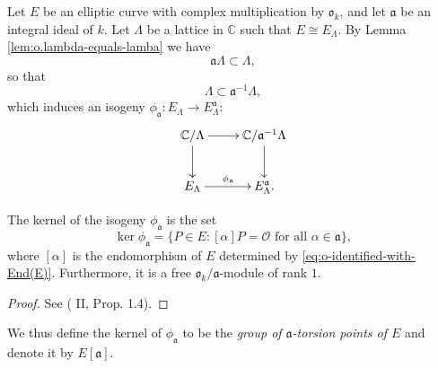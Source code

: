Let $E$ be an elliptic curve with complex multiplication by $\mathfrak{o}_{k}$, and
let $\mathfrak{a}$ be an integral ideal of $k$.  Let $\Lambda$ be a lattice in
$\mathbb{C}$ such that $E \cong E_{\Lambda}$.  By Lemma
\ref{lem:o.lambda-equals-lamba} we have
\begin{equation*}
  \mathfrak{a}\Lambda \subset \Lambda,
\end{equation*}
so that
\begin{equation*}
  \Lambda \subset \mathfrak{a}^{-1}\Lambda,
\end{equation*}
which induces an isogeny $\phi_{\mathfrak{a}} : E_{\Lambda} \rightarrow
E_{\Lambda}^{\mathfrak{a}}$:
\begin{equation*}
  \xymatrix{
    \mathbb{C} / \Lambda \ar[d] \ar[r] & \mathbb{C} / \mathfrak{a}^{-1}\Lambda \ar[d] \\
    E_{\Lambda} \ar[r]^{\phi_{\mathfrak{a}}} & E_{\Lambda}^{\mathfrak{a}}.
  }
\end{equation*}
\begin{prop}
  \label{prop:a-torsion-is-kernel}
  The kernel of the isogeny $\phi_{\mathfrak{a}}$ is the set
  \begin{equation*}
    \ker{\phi_{\mathfrak{a}}} = \{ P \in E : [\alpha]P = \mathcal{O} \text{ for all } \alpha
    \in \mathfrak{a} \},
  \end{equation*}
  where $[\alpha]$ is the endomorphism of $E$ determined by
  \eqref{eq:o-identified-with-End(E)}.  Furthermore, it is a free $\mathfrak{o}_{k} /
  \mathfrak{a}$-module of rank $1$.
\end{prop}
\begin{proof}
  See (\cite{silverman94} II, Prop. 1.4).
\end{proof}

We thus define the kernel of $\phi_{\mathfrak{a}}$ to be the \emph{group of
  $\mathfrak{a}$-torsion points of $E$} and denote it by $E[\mathfrak{a}]$.

